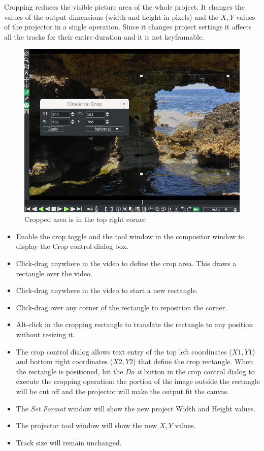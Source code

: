 Cropping reduces the visible picture area of the whole project. It changes the values of the output dimensions (width and height in pixels) and the $X, Y$ values of the projector in a single operation. Since it changes project settings it affects all the tracks for their entire duration and it is not keyframable. 

\begin{figure}[htpb]
    \centering
    \includegraphics[width=0.5\linewidth]{images/cropped_area.png}
    \caption{Cropped area is in the top right corner}
    \label{fig:cropped_area}
\end{figure}

\begin{itemize}
    \item Enable the crop toggle and the tool window in the compositor window to display the Crop control dialog box.
    \item Click-drag anywhere in the video to define the crop area. This draws a rectangle over the video.
    \item Click-drag anywhere in the video to start a new rectangle.
    \item Click-drag over any corner of the rectangle to reposition the corner.
    \item Alt-click in the cropping rectangle to translate the rectangle to any position without resizing it.
    \item The crop control dialog allows text entry of the top left coordinates ($X1,Y1$) and bottom right coordinates ($X2,Y2$) that define the crop rectangle. When the rectangle is positioned, hit the \emph{Do it} button in the crop control dialog to execute the cropping operation: the portion of the image outside  the rectangle will be cut off and the projector will make the output fit the canvas.
    \item The \textit{Set Format} window will show the new project Width and Height values.
    \item The projector tool window will show the new $X, Y$ values.
    \item Track size will remain unchanged.
\end{itemize}
 
